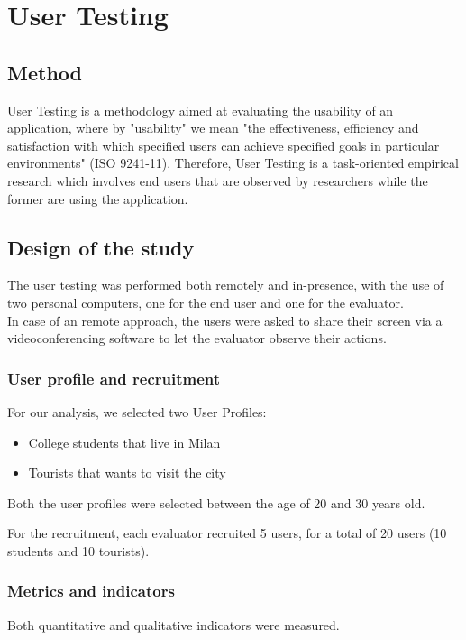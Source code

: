 
\section{User Testing}
\subsection{Method}

User Testing is a methodology aimed at evaluating the usability of an application, where by "usability" we mean "the effectiveness, efficiency and satisfaction with which specified users can achieve specified goals in particular environments" (ISO 9241-11). Therefore, User Testing is a task-oriented empirical research which involves end users that are observed by researchers while the former are using the application.

\subsection{Design of the study}
    The user testing was performed both remotely and in-presence, with the use of two personal computers, one for the end user and one for the evaluator.\\
    In case of an remote approach, the users were asked to share their screen via a videoconferencing software to let the evaluator observe their actions.

    \subsubsection{User profile and recruitment}
    For our analysis, we selected two User Profiles:

    \begin{itemize}
        \item College students that live in Milan 
        \item Tourists that wants to visit the city
    \end{itemize}

    Both the user profiles were selected between the age of 20 and 30 years old.

    For the recruitment, each evaluator recruited 5 users, for a total of 20 users (10 students and 10 tourists).

    \subsubsection{Metrics and indicators}
    Both quantitative and qualitative indicators were measured.

